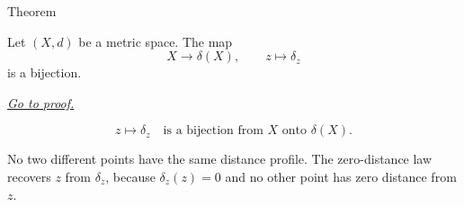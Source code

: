 \begin{theorembox}{Theorem}
\begin{theorem}
\label{thm:metric-point-functions-identify-points}
Let \((X,d)\) be a metric space.  The map
\[
  X\to\delta(X),
  \qquad
  z\mapsto\delta_z
\]
is a bijection.

\smallskip
\noindent
\hyperref[prf:metric-point-functions-identify-points]{\textit{Go to proof.}}
\end{theorem}
\end{theorembox}


\begin{remark*}
\[
z\mapsto\delta_z
\quad\text{is a bijection from }X\text{ onto }\delta(X).
\]
\end{remark*}

\begin{remark*}[Interpretation]
No two different points have the same distance profile.  The zero-distance
law recovers \(z\) from \(\delta_z\), because \(\delta_z(z)=0\) and no other
point has zero distance from \(z\).
\end{remark*}

